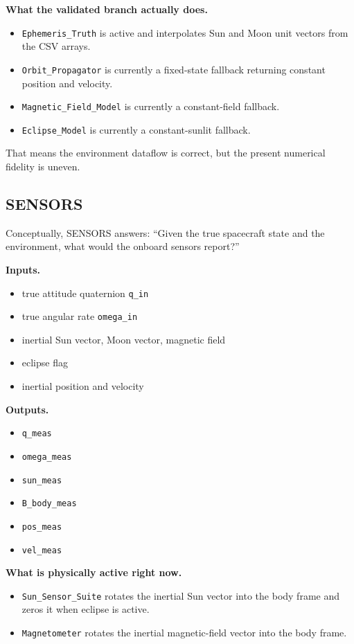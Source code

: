 \documentclass[11pt]{article}
\begin{document}
\textbf{What the validated branch actually does.}

\begin{itemize}
\item \texttt{Ephemeris\_Truth} is active and interpolates Sun and Moon unit vectors from the CSV arrays.
\item \texttt{Orbit\_Propagator} is currently a fixed-state fallback returning constant position and velocity.
\item \texttt{Magnetic\_Field\_Model} is currently a constant-field fallback.
\item \texttt{Eclipse\_Model} is currently a constant-sunlit fallback.
\end{itemize}

That means the environment dataflow is correct, but the present numerical fidelity is uneven.

\subsection{SENSORS}

Conceptually, SENSORS answers: ``Given the true spacecraft state and the environment, what would the onboard sensors report?''

\textbf{Inputs.}

\begin{itemize}
\item true attitude quaternion \texttt{q\_in}
\item true angular rate \texttt{omega\_in}
\item inertial Sun vector, Moon vector, magnetic field
\item eclipse flag
\item inertial position and velocity
\end{itemize}

\textbf{Outputs.}

\begin{itemize}
\item \texttt{q\_meas}
\item \texttt{omega\_meas}
\item \texttt{sun\_meas}
\item \texttt{B\_body\_meas}
\item \texttt{pos\_meas}
\item \texttt{vel\_meas}
\end{itemize}

\textbf{What is physically active right now.}

\begin{itemize}
\item \texttt{Sun\_Sensor\_Suite} rotates the inertial Sun vector into the body frame and zeros it when eclipse is active.
\item \texttt{Magnetometer} rotates the inertial magnetic-field vector into the body frame.
\end{itemize}
\end{document}
